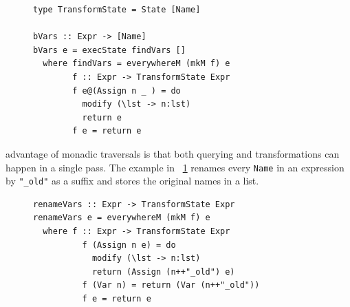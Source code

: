 \DIFdelbegin %

\DIFdelend \DIFaddbegin \begin{figure}[t]
\begin{lstlisting}
type TransformState = State [Name]

bVars :: Expr -> [Name]
bVars e = execState findVars []
  where findVars = everywhereM (mkM f) e
        f :: Expr -> TransformState Expr
        f e@(Assign n _ ) = do
          modify (\lst -> n:lst)
          return e
        f e = return e
\end{lstlisting}
\caption{}
\end{figure}
\DIFaddend 

\DIFdelbegin {}\DIFdelend \DIFaddbegin {}\DIFaddend advantage of monadic traversals is that both querying and transformations can happen in a single pass. The example in \DIFdelbegin {}\DIFdelend \DIFaddbegin {}\DIFaddend ~\ref{renameVars} renames every \texttt{Name} in an expression by \DIFdelbegin {}\DIFdelend \DIFaddbegin {}\DIFaddend \texttt{"\_old"} as a suffix and stores the original names in a list. 

\DIFdelbegin %
\DIFdelend \DIFaddbegin \begin{figure}[t]
\begin{lstlisting}
renameVars :: Expr -> TransformState Expr
renameVars e = everywhereM (mkM f) e
  where f :: Expr -> TransformState Expr
          f (Assign n e) = do
            modify (\lst -> n:lst)
            return (Assign (n++"_old") e)
          f (Var n) = return (Var (n++"_old"))
          f e = return e
\end{lstlisting}
\caption{}
\label{renameVars}
\end{figure}
 \DIFaddend 

